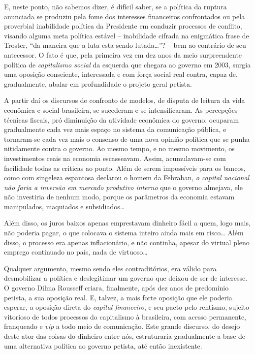 E, neste ponto, não sabemos dizer, é difícil saber, se a política da
ruptura anunciada se produziu pela fome dos interesses financeiros
confrontados ou pela proverbial inabilidade política da Presidente em
conduzir processos de conflito, visando alguma meta política estável --
inabilidade cifrada na enigmática frase de Troster, ``da maneira que a
luta esta sendo lutada…''? -- bem ao contrário de seu antecessor. O
fato é que, pela primeira vez em dez anos da meio surpreendente política
de \emph{capitalismo social} da esquerda que chegara ao governo em 2003,
surgia uma oposição consciente, interessada e com força social real
contra, capaz de, gradualmente, abalar em profundidade o projeto geral
petista.

A partir daí os discursos de confronto de modelos, de disputa de leitura
da vida econômica e social brasileira, se sucederam e se intensificaram.
As percepções técnicas fiscais, pró diminuição da atividade econômica do
governo, ocuparam gradualmente cada vez mais espaço no sistema da
comunicação pública, e tornaram-se cada vez mais o consenso de uma nova
opinião política que se punha nitidamente contra o governo. Ao mesmo
tempo, e no mesmo movimento, os investimentos reais na economia
escasseavam. Assim, acumulavam-se com facilidade todas as criticas ao
ponto. Além de serem impossíveis para os bancos, como com singeleza
espantosa declarou o homem da Febraban, \emph{o capital nacional não
faria a inversão em mercado produtivo interno} que o governo almejava,
ele não investiria de nenhum modo, porque os parâmetros da economia
estavam manipulados, maquiados e subsidiados…

Além disso, os juros baixos apenas emprestavam dinheiro fácil a quem,
logo mais, não poderia pagar, o que colocava o sistema inteiro ainda
mais em risco… Além disso, o processo era apenas inflacionário, e não
continha, apesar do virtual pleno emprego continuado no país, nada de
virtuoso…

Qualquer argumento, mesmo sendo eles contraditórios, era válido para
desmobilizar a política e deslegitimar um governo que deixou de ser de
interesse. O governo Dilma Rousseff criara, finalmente, após dez anos de
predomínio petista, a sua oposição real. E, talvez, a mais forte
oposição que ele poderia esperar, a oposição direta do \emph{capital
financeiro}, e seu pacto pelo rentismo, sujeito vitorioso de todos
processos do capitalismo à brasileira, com acesso permanente, franqueado
e \emph{vip} a todo meio de comunicação. Este grande discurso, do desejo
deste ator das coisas do dinheiro entre nós, estruturaria gradualmente a
base de uma alternativa política ao governo petista, até então
inexistente.

